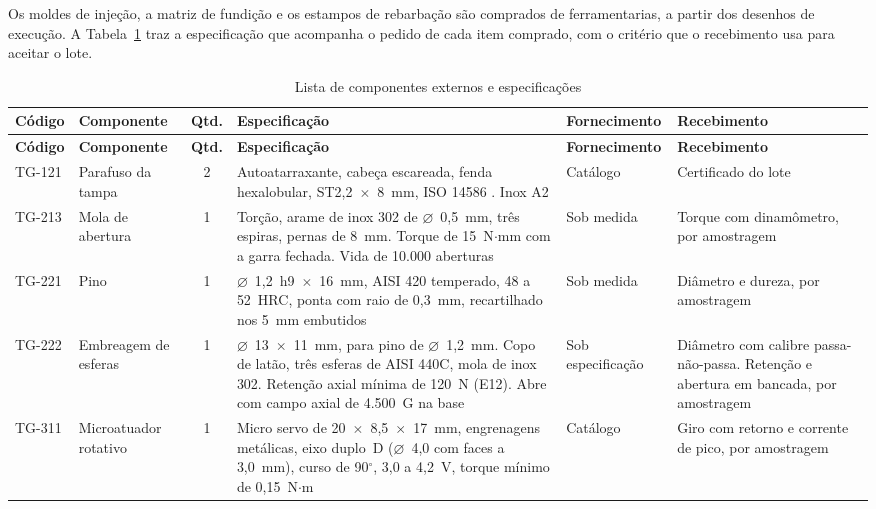 Os moldes de injeção, a matriz de fundição e os estampos de rebarbação são comprados de ferramentarias, a partir dos desenhos de execução. A Tabela~\ref{tab:ext_lista} traz a especificação que acompanha o pedido de cada item comprado, com o critério que o recebimento usa para aceitar o lote.

\begin{landscape}
\begingroup
\footnotesize
\renewcommand{\arraystretch}{1.25}
\begin{longtable}{@{}
    >{\RaggedRight\arraybackslash}p{1.3cm}
    >{\RaggedRight\arraybackslash}p{2.6cm}
    c
    >{\RaggedRight\arraybackslash}p{9.4cm}
    >{\RaggedRight\arraybackslash}p{2.6cm}
    >{\RaggedRight\arraybackslash}p{5.0cm}@{}}
    \caption{Lista de componentes externos e especificações}\label{tab:ext_lista}\\
    \toprule
    \textbf{Código} & \textbf{Componente} & \textbf{Qtd.} & \textbf{Especificação} & \textbf{Fornecimento} & \textbf{Recebimento} \\
    \midrule
    \endfirsthead
    \toprule
    \textbf{Código} & \textbf{Componente} & \textbf{Qtd.} & \textbf{Especificação} & \textbf{Fornecimento} & \textbf{Recebimento} \\
    \midrule
    \endhead
    \bottomrule
    \endfoot
    TG-121 & Parafuso da tampa & 2 & Autoatarraxante, cabeça escareada, fenda hexalobular, ST2,2~$\times$~8~mm, ISO 14586 \cite{iso14586}. Inox A2 & Catálogo & Certificado do lote \\
    TG-213 & Mola de abertura & 1 & Torção, arame de inox 302 de $\varnothing$~0,5~mm, três espiras, pernas de 8~mm. Torque de 15~N$\cdot$mm com a garra fechada. Vida de 10.000 aberturas & Sob medida & Torque com dinamômetro, por amostragem \\
    TG-221 & Pino & 1 & $\varnothing$~1,2~h9~$\times$~16~mm, AISI 420 temperado, 48 a 52~HRC, ponta com raio de 0,3~mm, recartilhado nos 5~mm embutidos & Sob medida & Diâmetro e dureza, por amostragem \\
    TG-222 & Embreagem de esferas & 1 & $\varnothing$~13~$\times$~11~mm, para pino de $\varnothing$~1,2~mm. Copo de latão, três esferas de AISI 440C, mola de inox 302. Retenção axial mínima de 120~N (E12). Abre com campo axial de 4.500~G na base & Sob especificação & Diâmetro com calibre passa-não-passa. Retenção e abertura em bancada, por amostragem \\
    TG-311 & Microatuador rotativo & 1 & Micro servo de 20~$\times$~8,5~$\times$~17~mm, engrenagens metálicas, eixo duplo~D ($\varnothing$~4,0 com faces a 3,0~mm), curso de 90$^\circ$, 3,0 a 4,2~V, torque mínimo de 0,15~N$\cdot$m & Catálogo & Giro com retorno e corrente de pico, por amostragem \\

\end{longtable}
\end{landscape}
